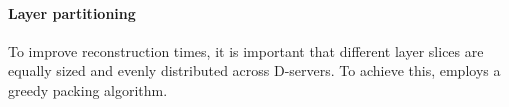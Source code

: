 \paragraph{Layer partitioning}
To improve reconstruction times, it is important that different layer slices
are equally sized and evenly distributed across D-servers.
%
%
To achieve this, \sysname employs a greedy packing algorithm.
